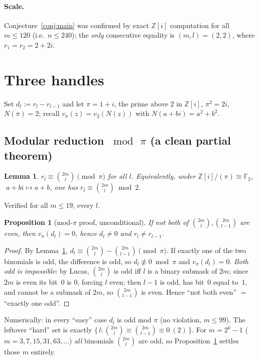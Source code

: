 \documentclass[11pt]{article}
\newtheorem{proposition}{Proposition}
\newtheorem{lemma}{Lemma}
\theoremstyle{definition}
\newcommand{\Z}{\mathbb{Z}}
\newcommand{\Zi}{\Z[i]}
\newcommand{\vpi}{v_\pi}
\begin{document}
\paragraph{Scale.} Conjecture~\ref{conj:main} was confirmed by exact $\Zi$
computation for all $m\le 120$ (i.e.\ $n\le 240$); the \emph{only} consecutive
equality is $(m,l)=(2,2)$, where $r_1=r_2=2+2i$.

\section{Three handles}

Set $d_l:=r_l-r_{l-1}$ and let $\pi=1+i$, the prime above $2$ in $\Zi$,
$\pi^2=2i$, $N(\pi)=2$; recall $\vpi(z)=v_2(N(z))$ with $N(a+bi)=a^2+b^2$.

\subsection{Modular reduction $\bmod\,\pi$ (a clean partial theorem)}

\begin{lemma}\label{lem:modpi}
$r_l\equiv\binom{2m}{l}\pmod\pi$ for all $l$. Equivalently, under
$\Zi/(\pi)\cong\mathbb{F}_2$, $\;a+bi\mapsto a+b$, one has
$r_l\equiv\binom{2m}{l}\bmod2$.
\end{lemma}
Verified for all $m\le 19$, every $l$.

\begin{proposition}[mod-$\pi$ proof, unconditional]\label{prop:notbotheven}
If \emph{not both} of $\binom{2m}{l},\binom{2m}{l-1}$ are even, then
$\vpi(d_l)=0$, hence $d_l\ne0$ and $r_l\ne r_{l-1}$.
\end{proposition}
\begin{proof}
By Lemma~\ref{lem:modpi}, $d_l\equiv\binom{2m}{l}-\binom{2m}{l-1}\pmod\pi$.
If exactly one of the two binomials is odd, the difference is odd, so
$d_l\not\equiv0\bmod\pi$ and $\vpi(d_l)=0$.
\emph{Both odd is impossible}: by Lucas, $\binom{2m}{l}$ is odd iff $l$ is a
binary submask of $2m$; since $2m$ is even its bit~$0$ is $0$, forcing $l$ even;
then $l-1$ is odd, has bit~$0$ equal to~$1$, and cannot be a submask of $2m$, so
$\binom{2m}{l-1}$ is even. Hence ``not both even'' $=$ ``exactly one odd''.
\end{proof}
Numerically: in every ``easy'' case $d_l$ is odd mod $\pi$ (no violation,
$m\le 99$). The leftover ``hard'' set is exactly
$\{\,l:\binom{2m}{l}\equiv\binom{2m}{l-1}\equiv0\ (2)\,\}$. For
$m=2^k-1$ ($m=3,7,15,31,63,\dots$) \emph{all} binomials $\binom{2m}{l}$ are odd,
so Proposition~\ref{prop:notbotheven} settles those $m$ entirely.
\end{document}
